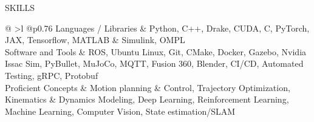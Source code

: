 \documentclass{resume} %
\begin{document}
\begin{rSection}{SKILLS}
	\begin{tabular}{ @ {} >{\bfseries}l @{\hspace{3ex}}p{0.76\textwidth}}
		Languages / Libraries & Python, C++, Drake, CUDA, C, PyTorch, JAX, Tensorflow, MATLAB \& Simulink, OMPL                                                                                                       \\
		Software and Tools    & ROS, Ubuntu Linux, Git, CMake, Docker, Gazebo, Nvidia Issac Sim, PyBullet, MuJoCo, MQTT,
		Fusion 360, Blender, CI/CD, Automated Testing, gRPC, Protobuf                                                                                                                                                 \\
		Proficient Concepts   & Motion planning \& Control, Trajectory Optimization, Kinematics \& Dynamics Modeling, Deep Learning, Reinforcement Learning, Machine Learning, Computer Vision, State estimation/SLAM \\
	\end{tabular}
\end{rSection}

\vspace{-3mm}
\end{document}
